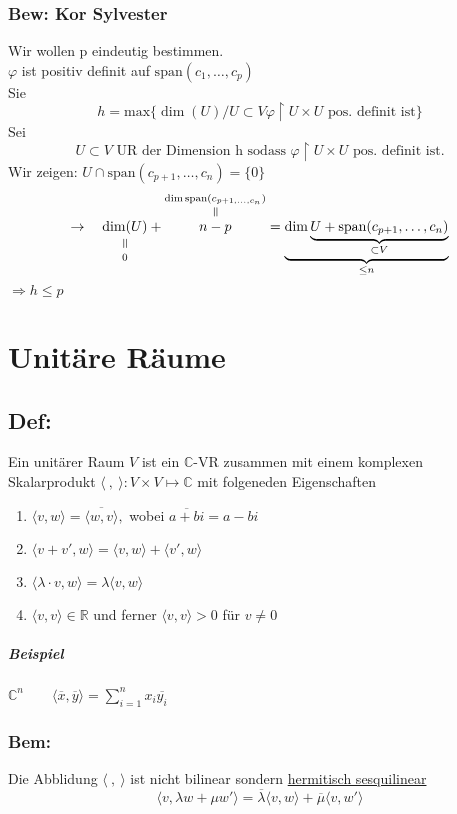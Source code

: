 \documentclass[titlepage,12pt,a4paper,ngerman]{report}
\newcommand{\verteq}{\rotatebox{90}{$\,=$}}
\newcommand{\equalto}[2]{\underset{\scriptstyle\overset{\mkern4mu\verteq}{#2}}{#1}}
\newcommand{\equaltoup}[2]{\overset{\scriptstyle\underset{\mkern4mu\verteq}{#2}}{#1}}
\newcommand{\tx}[1]{\textrm{#1}}
\newcommand{\ub}[1]{\underbrace{#1}}
\newcommand{\spa}{\tx{span}}
\newcommand{\summ}[2]{\sum_{#1}^{#2}}
\begin{document}
\subsection{Bew: Kor Sylvester}
Wir wollen p eindeutig bestimmen.\\
$ \varphi $ ist positiv definit auf $ \spa(c_1,\dots,c_p) $\\
Sie $$ h = \tx{max} \{\dim (U) / U \subset V \varphi\upharpoonright U \times U \tx{ pos. definit ist}\} $$
Sei $$ U \subset V \tx{ UR der Dimension h sodass } \varphi \upharpoonright U \times U \tx{ pos. definit ist.}$$
Wir zeigen: $ U \cap \spa (c_{p+1},\dots,c_n) = \{0\} $\\
$$ \rightarrow\quad  \equalto{\dim(U)}{0} + \equaltoup{n - p}{\dim \spa(c_{p+1,\dots,c_n})} = \ub{\dim \ub{U + \spa(c_{p+1},\dots,c_n)}_{\subset V}}_{\le n} $$
$ \Rightarrow h \le p  $

\chapter{Unitäre Räume}
\section{Def:} Ein unitärer Raum $V$ ist ein $\mathbb C$-VR zusammen mit einem komplexen Skalarprodukt $\langle\ ,\ \rangle : V \times V \mapsto \mathbb C$ mit folgeneden Eigenschaften
\begin{enumerate}
	\item $\langle v,w \rangle = \overline{\langle w,v \rangle},$ wobei $\overline{a+bi}=a-bi$
	\item $\langle v+ v', w \rangle = \langle v,w \rangle + \langle v',w \rangle$
	\item $\langle \lambda \cdot v, w \rangle = \lambda \langle v,w \rangle$
	\item $\langle v,v \rangle \in \mathbb R$ und ferner $\langle v,v \rangle > 0$ für $v \neq 0$ 
\end{enumerate}
\paragraph{Beispiel} $\mathbb C^n \qquad \langle \overline x, \overline y \rangle = \summ{i = 1}{n} x_i \overline{y_i}$

\subsection{Bem:}
Die Abblidung $ \langle\ ,\ \rangle $ ist nicht bilinear sondern \underline{hermitisch sesquilinear}
$$ \langle v,\lambda w + \mu w'\rangle = \overline{\lambda}\langle v,w \rangle + \overline{\mu} \langle v,w' \rangle$$
\end{document}

